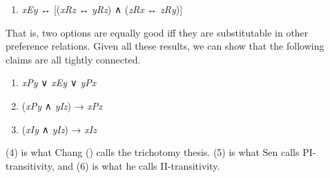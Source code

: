 \documentclass[
  11pt,
  letterpaper,
  DIV=11,
  numbers=noendperiod,
  twoside]{scrartcl}
\providecommand{\tightlist}{%
  \setlength{\itemsep}{0pt}\setlength{\parskip}{0pt}}
\begin{document}
\begin{enumerate}
\def\labelenumi{(\arabic{enumi})}
\setcounter{enumi}{2}
\tightlist
\item
  \emph{xEy} ↔︎ {[}(\emph{xRz} ↔︎ \emph{yRz}) ∧ (\emph{zRx} ↔︎
  \emph{zRy}){]}
\end{enumerate}

That is, two options are equally good iff they are substitutable in
other preference relations. Given all these results, we can show that
the following claims are all tightly connected.

\begin{enumerate}
\def\labelenumi{(\arabic{enumi})}
\setcounter{enumi}{3}
\tightlist
\item
  \emph{xPy} ∨ \emph{xEy} ∨ \emph{yPx}
\item
  (\emph{xPy} ∧ \emph{yIz}) → \emph{xPz}
\item
  (\emph{xIy} ∧ \emph{yIz}) → \emph{xIz}
\end{enumerate}

(4) is what Chang () calls the trichotomy
thesis. (5) is what Sen calls PI-transitivity, and (6) is what he calls
II-transitivity.
\end{document}

